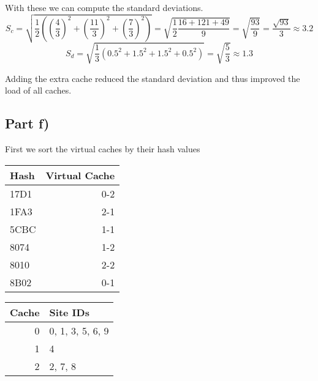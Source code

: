 \documentclass[10pt,a4paper]{article}
\begin{document}
With these we can compute the standard deviations.
\begin{equation*}
  S_{c} = \sqrt{\frac{1}{2} \left( \left(\frac{4}{3}\right)^{2} + \left(\frac{11}{3}\right)^{2} + \left(\frac{7}{3}\right)^{2} \right)} = \sqrt{\frac{1}{2} \frac{16 + 121 + 49}{9}} = \sqrt{\frac{93}{9}} = \frac{\sqrt{93}}{3} \approx 3.2
\end{equation*}
\begin{equation*}
  S_{d} = \sqrt{\frac{1}{3} \left( 0.5^{2} + 1.5^{2} + 1.5^{2} + 0.5^{2} \right)} = \sqrt{\frac{5}{3}} \approx 1.3
\end{equation*}

Adding the extra cache reduced the standard deviation and thus improved the load of all caches.

\subsection*{Part f)}

First we sort the virtual caches by their hash values
\begin{tabular}{lr}
Hash & Virtual Cache\\
\hline
17D1 & 0-2\\
1FA3 & 2-1\\
5CBC & 1-1\\
8074 & 1-2\\
8010 & 2-2\\
8B02 & 0-1\\
\end{tabular}
\begin{comment}
#+ORGTBL: SEND exercise-2-f-sorted orgtbl-to-latex :splice nil :skip 0 :raw t
| Hash | Virtual Cache |
|------+---------------|
| 17D1 |           0-2 |
| 1FA3 |           2-1 |
| 5CBC |           1-1 |
| 8074 |           1-2 |
| 8010 |           2-2 |
| 8B02 |           0-1 |
\end{comment}

\begin{tabular}{rl}
Cache & Site IDs\\
\hline
0 & 0, 1, 3, 5, 6, 9\\
1 & 4\\
2 & 2, 7, 8\\
\end{tabular}
\begin{comment}
#+ORGTBL: SEND exercise-2-f orgtbl-to-latex :splice nil :skip 0
| Cache | Site IDs         |
|-------+------------------|
|     0 | 0, 1, 3, 5, 6, 9 |
|     1 | 4                |
|     2 | 2, 7, 8          |
\end{comment}
\end{document}
